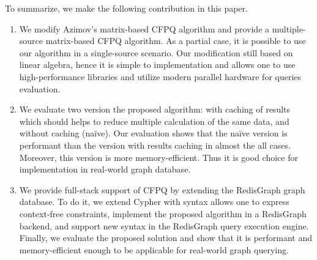 To summarize, we make the following contribution in this paper.
\begin{enumerate}
	\item We modify Azimov's matrix-based CFPQ algorithm and provide a multiple-source matrix-based CFPQ algorithm.
	As a partial case, it is possible to use our algorithm in a single-source scenario.
	Our modification still based on linear algebra, hence it is simple to implementation and allows one to use high-performance libraries and utilize modern parallel hardware for queries evaluation. 
	\item We evaluate two version the proposed algorithm: with caching of results which should helps to reduce multiple calculation of the same data, and without caching (na\"{i}ve).
	Our evaluation shows that the na\"{i}ve version is performant than the version with results caching in almost the all cases. Moreover, this version is more memory-efficient. Thus it is good choice for implementation in real-world graph database.
	\item We provide full-stack support of CFPQ by extending the RedisGraph graph database.
	To do it, we extend Cypher with syntax allows one to express context-free constraints, implement the proposed algorithm in a RedisGraph backend, and support new syntax in the RedisGraph query execution engine. Finally, we evaluate the proposed solution and show that it is performant and memory-efficient enough to be applicable for real-world graph querying.
\end{enumerate}